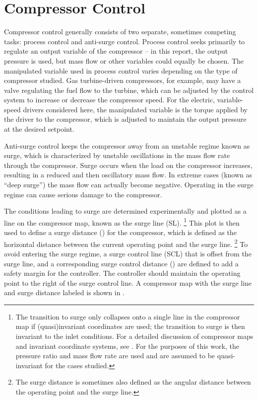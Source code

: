 \section{Compressor Control}
\label{sec:intro:compressor}

Compressor control generally consists of two separate, sometimes competing tasks: process control and anti-surge control.
Process control seeks primarily to regulate an output variable of the compressor -- in this report, the output pressure is used, but mass flow or other variables could equally be chosen.
The manipulated variable used in process control varies depending on the type of compressor studied.
Gas turbine-driven compressors, for example, may have a valve regulating the fuel flow to the turbine, which can be adjusted by the control system to increase or decrease the compressor speed. 
For the electric, variable-speed drivers considered here, the manipulated variable is the torque applied by the driver to the compressor, which is adjusted to maintain the output pressure at the desired setpoint.

Anti-surge control keeps the compressor away from an unstable regime known as surge, which is characterized by unstable oscillations in the mass flow rate through the compressor.
Surge occurs when the load on the compressor increases, resulting in a reduced and then oscillatory mass flow.
In extreme cases (known as ``deep surge'') the mass flow can actually become negative.
Operating in the surge regime can cause serious damage to the compressor.

The conditions leading to surge are determined experimentally and plotted as a line on the compressor map, known as the surge line (SL).
\footnote{The transition to surge only collapses onto a single line in the compressor map if (quasi)invariant coordinates are used; the transition to surge is then invariant to the inlet conditions. 
For a detailed discussion of compressor maps and invariant coordinate systems, see \cite{Batson1996}.
For the purposes of this work, the pressure ratio and mass flow rate are used and are assumed to be quasi-invariant for the cases studied.}
This plot is then used to define a surge distance () for the compressor, which is defined as the horizontal distance between the current operating point and the surge line.
\footnote{The surge distance is sometimes also defined as the angular distance between the operating point and the surge line.}
To avoid entering the surge regime, a surge control line (SCL) that is offset from the surge line, and a corresponding surge control distance () are defined to add a safety margin for the controller.
The controller should maintain the operating point to the right of the surge control line.
A compressor map with the surge line and surge distance labeled is shown in .

